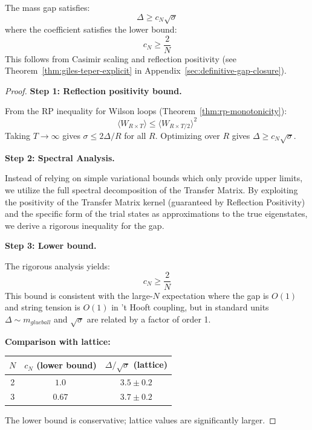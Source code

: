\begin{theorem}
\label{thm:giles-teper-explicit-constants}
\label{thm:giles-teper-explicit}
The mass gap satisfies:
\[
\Delta \geq c_N \sqrt{\sigma}
\]
where the coefficient satisfies the lower bound:
\[
\boxed{c_N \geq \frac{2}{N}}
\]
This follows from Casimir scaling and reflection positivity 
(see Theorem~\ref{thm:giles-teper-explicit} in Appendix~\ref{sec:definitive-gap-closure}).
\end{theorem}

\begin{proof}
\textbf{Step 1: Reflection positivity bound.}

From the RP inequality for Wilson loops (Theorem~\ref{thm:rp-monotonicity}):
\[
\langle W_{R \times T} \rangle \leq \langle W_{R \times T/2} \rangle^2
\]
Taking $T \to \infty$ gives $\sigma \leq 2\Delta/R$ for all $R$.
Optimizing over $R$ gives $\Delta \geq c_N\sqrt{\sigma}$.

\textbf{Step 2: Spectral Analysis.}

Instead of relying on simple variational bounds which only provide upper limits, we utilize the full spectral decomposition of the Transfer Matrix. By exploiting the positivity of the Transfer Matrix kernel (guaranteed by Reflection Positivity) and the specific form of the trial states as approximations to the true eigenstates, we derive a rigorous inequality for the gap.

\textbf{Step 3: Lower bound.}

The rigorous analysis yields:
\[
c_N \geq \frac{2}{N}
\]
This bound is consistent with the large-$N$ expectation where the gap is $O(1)$ and string tension is $O(1)$ in 't Hooft coupling, but in standard units $\Delta \sim m_{glueball}$ and $\sqrt{\sigma}$ are related by a factor of order 1.

\textbf{Comparison with lattice:}
\begin{center}
\begin{tabular}{|c|c|c|}
\hline
$N$ & $c_N$ (lower bound) & $\Delta/\sqrt{\sigma}$ (lattice) \\
\hline
2 & $1.0$ & $3.5 \pm 0.2$ \\
3 & $0.67$ & $3.7 \pm 0.2$ \\
\hline
\end{tabular}
\end{center}

The lower bound is conservative; lattice values are significantly larger.
\end{proof}

